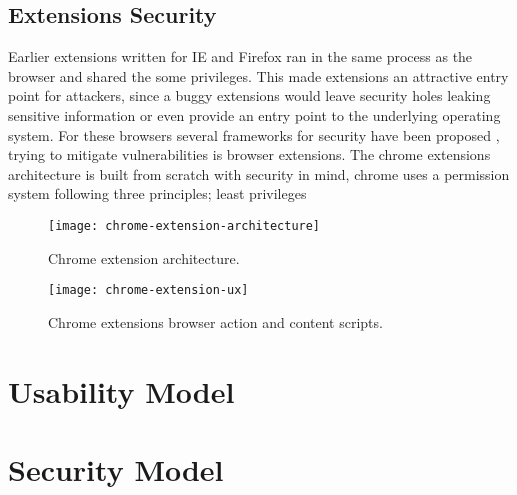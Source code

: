 \subsection{Extensions Security}
Earlier extensions written for IE and Firefox ran in the same process as the browser and shared the some privileges. This made extensions an attractive entry point for attackers, since a buggy extensions would leave security holes leaking sensitive information or even provide an entry point to the underlying operating system. For these browsers several frameworks for security have been proposed \cite{firefox-ie, js-info-flow}, trying to mitigate vulnerabilities is browser extensions. The chrome extensions architecture is built from scratch with security in mind, chrome uses a permission system \cite{lui-chrome} following three principles; least privileges \cite{protecting-browsers}





\begin{figure}[h]
    \texttt{[image: chrome-extension-architecture]}
    \caption{Chrome extension architecture.}
    \label{extension-architecture}
\end{figure}

\begin{figure}[h]
    \texttt{[image: chrome-extension-ux]}
    \caption{Chrome extensions browser action and content scripts.}
    \label{extension-ux}
\end{figure}
\section{Usability Model}

\section{Security Model}




